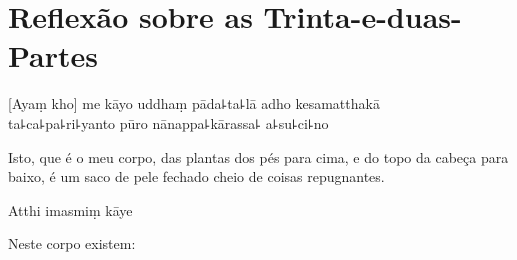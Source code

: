 \chapter[Trinta-e-duas-Partes]{Reflexão sobre as Trinta-e-duas-Partes}


\begin{leader}
\end{leader}

[Ayaṃ kho] me kāyo uddhaṃ pāda꜕ta꜕lā adho kesamatthakā\\
ta꜕ca꜕pa꜕ri꜕yanto pūro nānappa꜕kārassa꜕ a꜕su꜕ci꜕no

\begin{english}
  Isto, que é o meu corpo, das plantas dos pés para cima, e do topo da cabeça para baixo, é um saco de pele fechado cheio de coisas repugnantes.
\end{english}

Atthi imasmiṃ kāye

\begin{english}
  Neste corpo existem:
\end{english}

